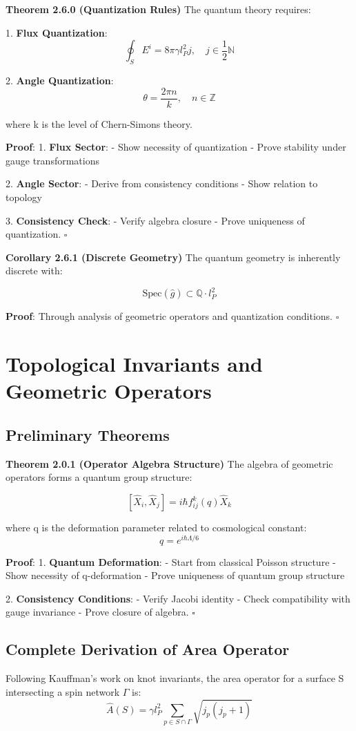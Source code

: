 \documentclass[12pt,a4paper]{article}
\begin{document}
\textbf{Theorem 2.6.0 (Quantization Rules)}
The quantum theory requires:

1. \textbf{Flux Quantization}:
   \[
   \oint_S E^i = 8\pi\gamma l_P^2 j, \quad j \in \frac{1}{2}\mathbb{N}
   \]

2. \textbf{Angle Quantization}:
   \[
   \theta = \frac{2\pi n}{k}, \quad n \in \mathbb{Z}
   \]

where k is the level of Chern-Simons theory.

\textbf{Proof}:
1. \textbf{Flux Sector}:
   - Show necessity of quantization
   - Prove stability under gauge transformations

2. \textbf{Angle Sector}:
   - Derive from consistency conditions
   - Show relation to topology

3. \textbf{Consistency Check}:
   - Verify algebra closure
   - Prove uniqueness of quantization. $\square$

\textbf{Corollary 2.6.1 (Discrete Geometry)}
The quantum geometry is inherently discrete with:

\[
\text{Spec}(\hat{g}) \subset \mathbb{Q}\cdot l_P^2
\]

\textbf{Proof}:
Through analysis of geometric operators and quantization conditions. $\square$

\section{Topological Invariants and Geometric Operators}
\subsection{Preliminary Theorems}

\textbf{Theorem 2.0.1 (Operator Algebra Structure)}
The algebra of geometric operators forms a quantum group structure:

\[
[\hat{X}_i, \hat{X}_j] = i\hbar f_{ij}^k(q)\hat{X}_k
\]

where q is the deformation parameter related to cosmological constant:
\[
q = e^{i\hbar\Lambda/6}
\]

\textbf{Proof}:
1. \textbf{Quantum Deformation}:
   - Start from classical Poisson structure
   - Show necessity of q-deformation
   - Prove uniqueness of quantum group structure

2. \textbf{Consistency Conditions}:
   - Verify Jacobi identity
   - Check compatibility with gauge invariance
   - Prove closure of algebra. $\square$

\subsection{Complete Derivation of Area Operator}
Following Kauffman's work on knot invariants\cite{kauffman1991knots}, the area operator for a surface S intersecting a spin network $\Gamma$ is:
\[
\hat{A}(S) = \gamma l_P^2 \sum_{p \in S \cap \Gamma} \sqrt{j_p(j_p+1)}
\]
\end{document}
